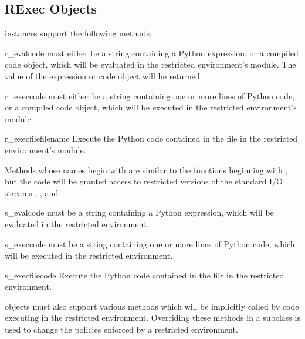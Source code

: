 \subsection{RExec Objects \label{rexec-objects}}

 instances support the following methods:

\begin{methoddesc}{r_eval}{code}
 must either be a string containing a Python expression, or
a compiled code object, which will be evaluated in the restricted
environment's  module.  The value of the expression or
code object will be returned.
\end{methoddesc}

\begin{methoddesc}{r_exec}{code}
 must either be a string containing one or more lines of
Python code, or a compiled code object, which will be executed in the
restricted environment's  module.
\end{methoddesc}

\begin{methoddesc}{r_execfile}{filename}
Execute the Python code contained in the file  in the
restricted environment's  module.
\end{methoddesc}

Methods whose names begin with  are similar to the functions
beginning with , but the code will be granted access to
restricted versions of the standard I/O streams ,
, and .

\begin{methoddesc}{s_eval}{code}
 must be a string containing a Python expression, which will
be evaluated in the restricted environment.  
\end{methoddesc}

\begin{methoddesc}{s_exec}{code}
 must be a string containing one or more lines of Python code,
which will be executed in the restricted environment.  
\end{methoddesc}

\begin{methoddesc}{s_execfile}{code}
Execute the Python code contained in the file  in the
restricted environment.
\end{methoddesc}

 objects must also support various methods which will be
implicitly called by code executing in the restricted environment.
Overriding these methods in a subclass is used to change the policies
enforced by a restricted environment.

